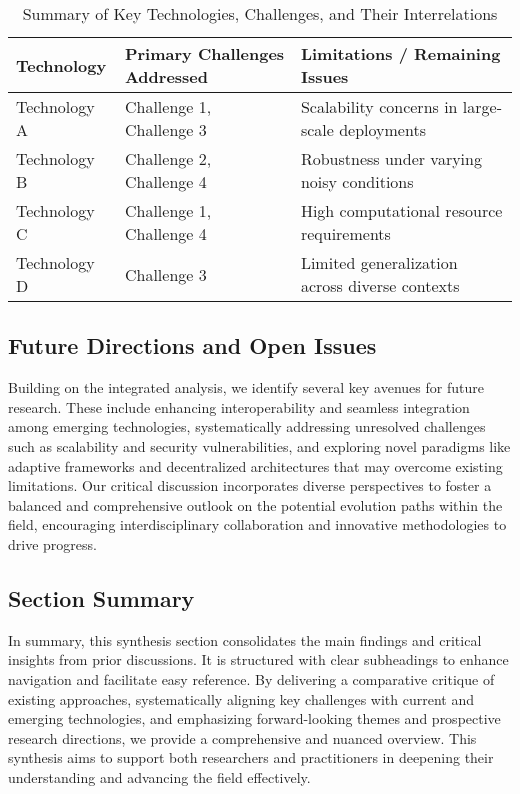 \documentclass[sigconf]{acmart}
\begin{document}
\begin{table*}[htbp]
\centering
\caption{Summary of Key Technologies, Challenges, and Their Interrelations}
\label{tab:challenge_technology_summary}
\begin{adjustbox}{max width=\textwidth}
\begin{tabular}{@{}lll@{}}
\toprule
\textbf{Technology} & \textbf{Primary Challenges Addressed} & \textbf{Limitations / Remaining Issues} \\ \midrule
Technology A & Challenge 1, Challenge 3 & Scalability concerns in large-scale deployments \\
Technology B & Challenge 2, Challenge 4 & Robustness under varying noisy conditions \\
Technology C & Challenge 1, Challenge 4 & High computational resource requirements \\
Technology D & Challenge 3 & Limited generalization across diverse contexts \\ \bottomrule
\end{tabular}
\end{adjustbox}
\end{table*}

\subsection{Future Directions and Open Issues}
Building on the integrated analysis, we identify several key avenues for future research. These include enhancing interoperability and seamless integration among emerging technologies, systematically addressing unresolved challenges such as scalability and security vulnerabilities, and exploring novel paradigms like adaptive frameworks and decentralized architectures that may overcome existing limitations. Our critical discussion incorporates diverse perspectives to foster a balanced and comprehensive outlook on the potential evolution paths within the field, encouraging interdisciplinary collaboration and innovative methodologies to drive progress.

\subsection{Section Summary}
In summary, this synthesis section consolidates the main findings and critical insights from prior discussions. It is structured with clear subheadings to enhance navigation and facilitate easy reference. By delivering a comparative critique of existing approaches, systematically aligning key challenges with current and emerging technologies, and emphasizing forward-looking themes and prospective research directions, we provide a comprehensive and nuanced overview. This synthesis aims to support both researchers and practitioners in deepening their understanding and advancing the field effectively.
\end{document}
